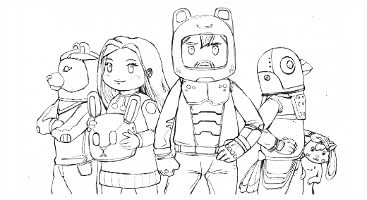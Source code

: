 \vspace*{\fill}

\includegraphics[width=.7\paperwidth]{Assets/cosmoose_cover_line_small}

\clearpage